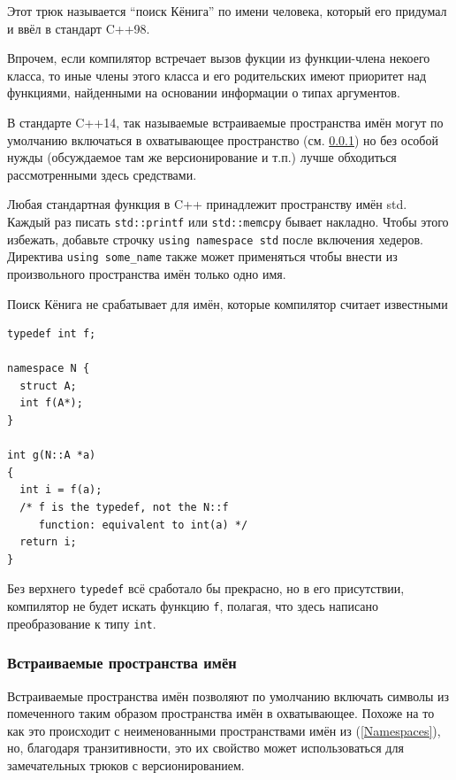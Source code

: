 \documentclass[a4paper,12pt,oneside]{article}
\begin{document}
Этот трюк называется ``поиск Кёнига'' по имени человека, который его придумал и ввёл в стандарт C++98.



Впрочем, если компилятор встречает вызов фукции из функции-члена некоего класса, то иные члены этого класса и его родительских имеют приоритет над функциями, найденными на основании информации о типах аргументов.

В стандарте C++14, так называемые встраиваемые пространства имён могут по умолчанию включаться в охватывающее пространство (см. \ref{InlineNameSpaces}) но без особой нужды (обсуждаемое там же версионирование и т.п.) лучше обходиться рассмотренными здесь средствами.

Любая стандартная функция в C++ принадлежит пространству имён std. Каждый раз писать \lstinline!std::printf! или \lstinline!std::memcpy! бывает накладно. Чтобы этого избежать, добавьте строчку \lstinline!using namespace std! после включения хедеров. Директива \lstinline!using some_name! также может применяться чтобы внести из произвольного пространства имён только одно имя.



Поиск Кёнига не срабатывает для имён, которые компилятор считает известными

\begin{lstlisting}
typedef int f;

namespace N {
  struct A;
  int f(A*);
}

int g(N::A *a)
{
  int i = f(a);
  /* f is the typedef, not the N::f
     function: equivalent to int(a) */
  return i;
}
\end{lstlisting}

Без верхнего \lstinline!typedef! всё сработало бы прекрасно, но в его присутствии, компилятор не будет искать функцию \lstinline!f!, полагая, что здесь написано преобразование к типу \lstinline!int!.

\subsubsection{Встраиваемые пространства имён}\label{InlineNameSpaces}

Встраиваемые пространства имён позволяют по умолчанию включать символы из помеченного таким образом пространства имён в охватывающее. Похоже на то как это происходит с неименованными пространствами имён из (\ref{Namespaces}), но, благодаря транзитивности, это их свойство может использоваться для замечательных трюков с версионированием.
\end{document}
